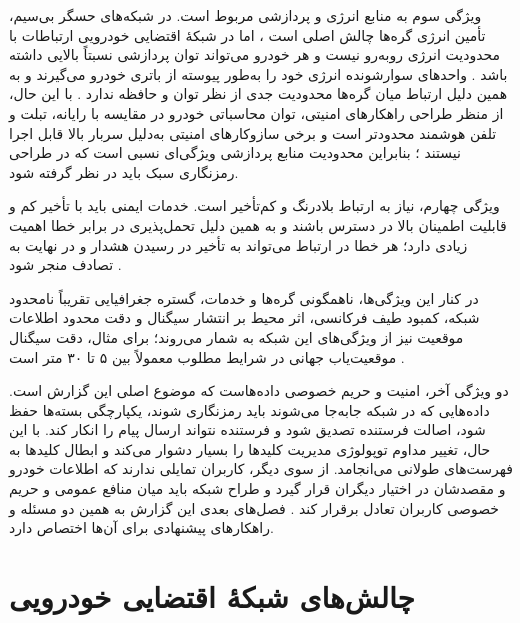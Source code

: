 \documentclass[12pt,a4paper]{article}
\begin{document}
ویژگی سوم به منابع انرژی و پردازشی مربوط است. در شبکه‌های حسگر بی‌سیم، تأمین انرژی گره‌ها چالش اصلی است \cite{hozouriOverviewVANETVehicular2023}، اما در شبکهٔ اقتضایی خودرویی ارتباطات با محدودیت انرژی روبه‌رو نیست و هر خودرو می‌تواند توان پردازشی نسبتاً بالایی داشته باشد \cite{luConnectedVehiclesSolutions2014}. واحد‌های سوارشونده انرژی خود را به‌طور پیوسته از باتری خودرو می‌گیرند و به همین دلیل ارتباط میان گره‌ها محدودیت جدی از نظر توان و حافظه ندارد \cite{hozouriOverviewVANETVehicular2023}. با این حال، از منظر طراحی راهکار‌های امنیتی، توان محاسباتی خودرو در مقایسه با رایانه، تبلت و تلفن هوشمند محدودتر است و برخی سازوکار‌های امنیتی به‌دلیل سربار بالا قابل اجرا نیستند \cite{farsimadanReviewSecurityChallenges2025}؛ بنابراین محدودیت منابع پردازشی ویژگی‌ای نسبی است که در طراحی رمزنگاری سبک باید در نظر گرفته شود.

ویژگی چهارم، نیاز به ارتباط بلادرنگ و کم‌تأخیر است. خدمات ایمنی باید با تأخیر کم و قابلیت اطمینان بالا در دسترس باشند \cite{hozouriOverviewVANETVehicular2023,luConnectedVehiclesSolutions2014} و به همین دلیل تحمل‌پذیری در برابر خطا اهمیت زیادی دارد؛ هر خطا در ارتباط می‌تواند به تأخیر در رسیدن هشدار و در نهایت به تصادف منجر شود \cite{hozouriOverviewVANETVehicular2023}.

در کنار این ویژگی‌ها، ناهمگونی گره‌ها و خدمات، گستره جغرافیایی تقریباً نامحدود شبکه، کمبود طیف فرکانسی، اثر محیط بر انتشار سیگنال و دقت محدود اطلاعات موقعیت نیز از ویژگی‌های این شبکه به شمار می‌روند؛ برای مثال، دقت سیگنال موقعیت‌یاب جهانی در شرایط مطلوب معمولاً بین ۵ تا ۳۰ متر است \cite{hozouriOverviewVANETVehicular2023}.

دو ویژگی آخر، امنیت و حریم خصوصی داده‌هاست که موضوع اصلی این گزارش است. داده‌هایی که در شبکه جابه‌جا می‌شوند باید رمزنگاری شوند، یکپارچگی بسته‌ها حفظ شود، اصالت فرستنده تصدیق شود و فرستنده نتواند ارسال پیام را انکار کند. با این حال، تغییر مداوم توپولوژی مدیریت کلید‌ها را بسیار دشوار می‌کند و ابطال کلید‌ها به فهرست‌های طولانی می‌انجامد. از سوی دیگر، کاربران تمایلی ندارند که اطلاعات خودرو و مقصدشان در اختیار دیگران قرار گیرد و طراح شبکه باید میان منافع عمومی و حریم خصوصی کاربران تعادل برقرار کند \cite{hozouriOverviewVANETVehicular2023}. فصل‌های بعدی این گزارش به همین دو مسئله و راهکار‌های پیشنهادی برای آن‌ها اختصاص دارد.


\section{چالش‌های شبکهٔ اقتضایی خودرویی}
\end{document}
